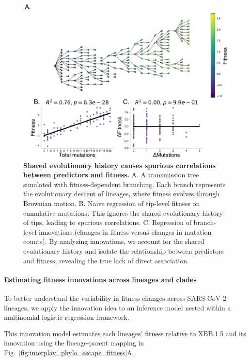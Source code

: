 \begin{figure}[h]
    \centering
    \includegraphics[width=1.0\textwidth]{./figures/synthetic-spurious-correlations.png}
    \caption[\textbf{Shared evolutionary history causes spurious correlations between predictors and fitness.}]{
	\textbf{Shared evolutionary history causes spurious correlations between predictors and fitness.}
	A. A transmission tree simulated with fitness-dependent branching.
	Each branch represents the evolutionary descent of lineages, where fitness evolves through Brownian motion.
	B. Naive regression of tip-level fitness on cumulative mutations.
	This ignores the shared evolutionary history of tips, leading to spurious correlations.
	C. Regression of branch-level innovations (changes in fitness versus changes in mutation counts).
	By analyzing innovations, we account for the shared evolutionary history and isolate the relationship between predictors and fitness, revealing the true lack of direct association.
    }
    \label{fig:shared_history_spurious_correlation}
\end{figure}


\paragraph{Estimating fitness innovations across lineages and clades}

To better understand the variability in fitness changes across SARS-CoV-2 lineages, we apply the innovation idea to an inference model nested within a multinomial logistic regression framework.

This innovation model estimates each lineages' fitness relative to XBB.1.5 and its innovation using the lineage-parent mapping in Fig.~\ref{fig:interplay_phylo_escape_fitness}A.

